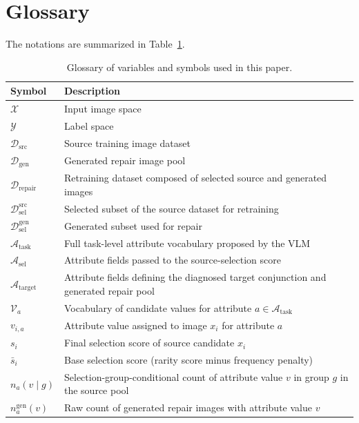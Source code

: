\section{Glossary}
\label{app:glossary}

The notations are summarized in Table~\ref{tab:glossary}.

\begin{table}[t]
\centering
\caption{Glossary of variables and symbols used in this paper.}
\label{tab:glossary}
\small
\begin{tabular}{ll}
\toprule
\rowcolor{sectiongray} \textbf{Symbol} & \textbf{Description} \\
\midrule
$\mathcal{X}$ & Input image space \\
$\mathcal{Y}$ & Label space \\
$\mathcal{D}_{\mathrm{src}}$ & Source training image dataset \\
$\mathcal{D}_{\mathrm{gen}}$ & Generated repair image pool \\
$\mathcal{D}_{\mathrm{repair}}$ & Retraining dataset composed of selected source and generated images \\
$\mathcal{D}_{\mathrm{sel}}^{\mathrm{src}}$ & Selected subset of the source dataset for retraining \\
$\mathcal{D}_{\mathrm{sel}}^{\mathrm{gen}}$ & Generated subset used for repair \\
$\mathcal{A}_{\mathrm{task}}$ & Full task-level attribute vocabulary proposed by the VLM \\
$\mathcal{A}_{\mathrm{sel}}$ & Attribute fields passed to the source-selection score \\
$\mathcal{A}_{\mathrm{target}}$ & Attribute fields defining the diagnosed target conjunction and generated repair pool \\
$\mathcal{V}_a$ & Vocabulary of candidate values for attribute $a \in \mathcal{A}_{\mathrm{task}}$ \\
$v_{i,a}$ & Attribute value assigned to image $x_i$ for attribute $a$ \\
$s_i$ & Final selection score of source candidate $x_i$ \\
$\bar{s}_i$ & Base selection score (rarity score minus frequency penalty) \\
$n_a(v \mid g)$ & Selection-group-conditional count of attribute value $v$ in group $g$ in the source pool \\
$n_a^{\mathrm{gen}}(v)$ & Raw count of generated repair images with attribute value $v$ \\

\end{tabular}
\end{table}
